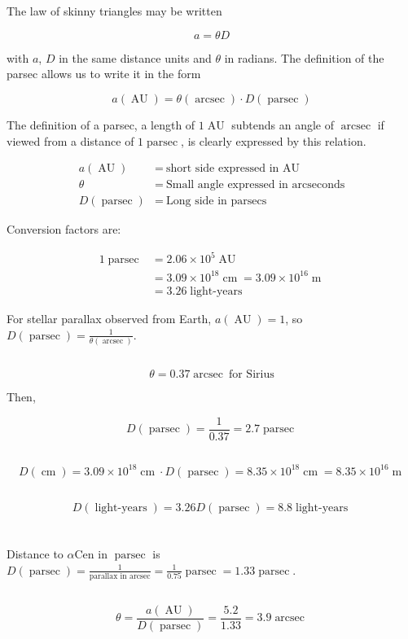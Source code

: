 \documentclass[11pt]{scrartcl}
\DeclareMathOperator{\AU}{AU}
\DeclareMathOperator{\arcsec}{arcsec}
\DeclareMathOperator{\m}{m}
\DeclareMathOperator{\cm}{cm}
\DeclareMathOperator{\parsec}{parsec}
\DeclareMathOperator{\lightyears}{light-years}
\newcommand\pow[2]{\ensuremath{#1 \times 10^{#2}}}
\begin{document}
\section{}

The law of skinny triangles may be written 

\[a = \theta D\]

with $a$, $D$ in the same distance units and $\theta$ in radians. The definition of the parsec allows us to write it in the form

\[a(\AU) = \theta(\arcsec) \cdot D (\parsec)\]

The definition of a parsec, a length of $1\AU$ subtends an angle of $\arcsec$ if viewed from a distance of $1 \parsec$, is clearly expressed by this relation.

\begin{align*}
a(\AU) &= \ \text{short side expressed in AU} \\
\theta &= \ \text{Small angle expressed in arcseconds} \\
D(\parsec) &= \ \text{Long side in parsecs}
\end{align*}

Conversion factors are:

\begin{align*}
1 \parsec &= \pow{2.06}{5}\AU \\
&= \pow{3.09}{18}\cm = \pow{3.09}{16}\m \\
&= 3.26 \lightyears
\end{align*}

For stellar parallax observed from Earth, $a(\AU) = 1$, so $D(\parsec) = \frac{1}{\theta(\arcsec)}$.


\subsection{}

\[\theta = 0.37\arcsec \ \text{for Sirius}\]

Then,

\[D(\parsec) = \frac{1}{0.37} = 2.7\parsec\]

\subsection{}

\[D(\cm) = \pow{3.09}{18}\cm \cdot D(\parsec) = \pow{8.35}{18}\cm = \pow{8.35}{16}\m\]

\subsection{}

\[D(\lightyears) = 3.26D(\parsec) = 8.8\lightyears\]


\section{}

\subsection{}

Distance to $\alpha$Cen in $\parsec$ is $D(\parsec) = \frac{1}{\text{parallax in arcsec}} = \frac{1}{0.75}\parsec = 1.33\parsec$.

\subsection{}

\[\theta = \frac{a(\AU)}{D(\parsec)} = \frac{5.2}{1.33} = 3.9\arcsec\]
\end{document}
